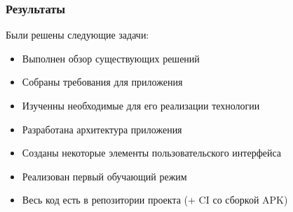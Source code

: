 \documentclass{beamer}
\begin{document}
\begin{frame}
  \frametitle{Результаты}
  Были решены следующие задачи:
  \begin{itemize}
    \item Выполнен обзор существующих решений
    \item Собраны требования для приложения
    \item Изученны необходимые для его реализации технологии
    \item Разработана архитектура приложения
    \item Созданы некоторые элементы пользовательского интерфейса
    \item Реализован первый обучающий режим
  \end{itemize}

  \begin{itemize}
    \item Весь код есть в репозитории проекта (+ CI со сборкой APK)
  \end{itemize}
\end{frame}
\end{document}
